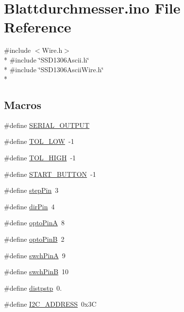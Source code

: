 \hypertarget{Blattdurchmesser_8ino}{\section{Blattdurchmesser.\-ino File Reference}
\label{Blattdurchmesser_8ino}
}
{\ttfamily \#include $<$Wire.\-h$>$}\\*
{\ttfamily \#include \char`\"{}S\-S\-D1306\-Ascii.\-h\char`\"{}}\\*
{\ttfamily \#include \char`\"{}S\-S\-D1306\-Ascii\-Wire.\-h\char`\"{}}\\*
\subsection*{Macros}
\begin{DoxyCompactItemize}
\item 
\#define \hyperlink{Blattdurchmesser_8ino_a2f9ed52434a5ed4bf03fcf6629769173}{S\-E\-R\-I\-A\-L\-\_\-\-O\-U\-T\-P\-U\-T}
\item 
\#define \hyperlink{Blattdurchmesser_8ino_a9015a3a47cbeefcaa5b0aebe3f52532d}{T\-O\-L\-\_\-\-L\-O\-W}~-\/1
\item 
\#define \hyperlink{Blattdurchmesser_8ino_a269e54b628907914121f41200597b3dc}{T\-O\-L\-\_\-\-H\-I\-G\-H}~-\/1
\item 
\#define \hyperlink{Blattdurchmesser_8ino_ab341b8680b89a9888189982451117fbf}{S\-T\-A\-R\-T\-\_\-\-B\-U\-T\-T\-O\-N}~-\/1
\item 
\#define \hyperlink{Blattdurchmesser_8ino_a81d7b528b321b301a71d2eed09b638a0}{step\-Pin}~3
\item 
\#define \hyperlink{Blattdurchmesser_8ino_a4a85ab03cecd5c848447656e4a54f858}{dir\-Pin}~4
\item 
\#define \hyperlink{Blattdurchmesser_8ino_ab8cd09a79fb3c37c7ca7df6b72035409}{opto\-Pin\-A}~8
\item 
\#define \hyperlink{Blattdurchmesser_8ino_a32334acf24a1256a966b35b9ca53256a}{opto\-Pin\-B}~2
\item 
\#define \hyperlink{Blattdurchmesser_8ino_a2320f154fd312add121a0b94304e0958}{swch\-Pin\-A}~9
\item 
\#define \hyperlink{Blattdurchmesser_8ino_a942f8d65eafc5fb8631fec0f36724f41}{swch\-Pin\-B}~10
\item 
\#define \hyperlink{Blattdurchmesser_8ino_a413b8bff791c290f7693feae315d820d}{distpstp}~0.
\item 
\#define \hyperlink{Blattdurchmesser_8ino_a770f0c15acd838afca500d56b792c6b5}{I2\-C\-\_\-\-A\-D\-D\-R\-E\-S\-S}~0x3\-C
\end{DoxyCompactItemize}
